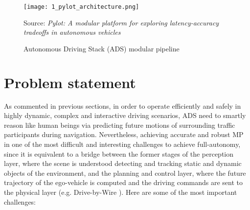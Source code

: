 \begin{figure}[h]
	\centering
	\texttt{[image: 1\_pylot\_architecture.png]}
	\caption{Autonomous Driving Stack (ADS) modular pipeline}
	Source: \textit{Pylot: A modular platform for exploring latency-accuracy tradeoffs in autonomous vehicles} \cite{gog2021pylot}
	\label{fig:1_pylot_architecture}
\end{figure}

\section{Problem statement}
\label{sec:1_problem_statement}

As commented in previous sections, in order to operate efficiently and safely in highly dynamic, complex and interactive driving scenarios, \acs{ADS} need to smartly reason like human beings via predicting future motions of surrounding traffic participants during navigation. Nevertheless, achieving accurate and robust \ac{MP} in one of the most difficult and interesting challenges to achieve full-autonomy, since it is equivalent to a bridge between the former stages of the perception layer, where the scene is understood detecting and tracking static and dynamic objects of the environment, and the planning and control layer, where the future trajectory of the ego-vehicle is computed and the driving commands are sent to the physical layer (e.g. Drive-by-Wire \cite{arango2020drive}). Here are some of the most important challenges: 

